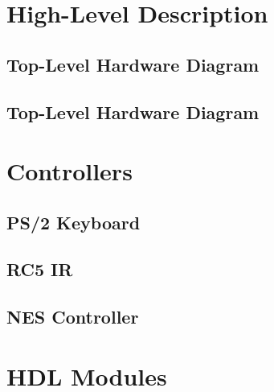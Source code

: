 \documentclass[12pt]{article}
\begin{document}
\section{High-Level Description}

\subsection{Top-Level Hardware Diagram}

\subsection{Top-Level Hardware Diagram}

\section{Controllers}

\subsection{PS/2 Keyboard}

\subsection{RC5 IR}

\subsection{NES Controller}

\section{HDL Modules}
\end{document}
